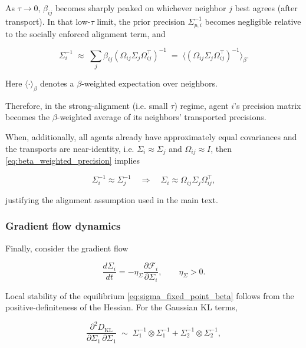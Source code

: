 \documentclass[11pt]{article}
\begin{document}
As $\tau \to 0$, $\beta_{ij}$ becomes sharply peaked on whichever neighbor $j$ best agrees (after transport). In that low-$\tau$ limit, the prior precision $\Sigma_{p,i}^{-1}$ becomes negligible relative to the socially enforced alignment term, and

\begin{equation}
\boxed{
\Sigma_i^{-1}
\;\approx\;
\sum_j \beta_{ij}
(\Omega_{ij}\Sigma_j\Omega_{ij}^\top)^{-1}
\;=\;\big\langle(\Omega_{ij}\Sigma_j\Omega_{ij}^\top)^{-1}
\big\rangle_{\beta}.}
\label{eq:beta_weighted_precision}
\end{equation}

Here $\langle \cdot \rangle_{\beta}$ denotes a $\beta$-weighted expectation over neighbors.  

Therefore, in the strong-alignment (i.e. small $\tau$) regime, agent $i$’s precision matrix becomes the $\beta$-weighted average of its neighbors' transported precisions.

When, additionally, all agents already have approximately equal covariances and the transports are near-identity, i.e. $\Sigma_i \approx \Sigma_j$ and $\Omega_{ij} \approx I$, then \eqref{eq:beta_weighted_precision} implies

\begin{equation}
\Sigma_i^{-1} \approx \Sigma_j^{-1}
\quad\Longrightarrow\quad
\Sigma_i \approx \Omega_{ij}\Sigma_j\Omega_{ij}^\top,
\end{equation}

justifying the alignment assumption used in the main text.

\subsubsection{Gradient flow dynamics}

Finally, consider the gradient flow

\begin{equation}
\frac{d\Sigma_i}{dt}
=-\eta_\Sigma
\frac{\partial \mathcal{F}_i}{\partial \Sigma_i},
\qquad\eta_\Sigma > 0.
\end{equation}

Local stability of the equilibrium \eqref{eq:sigma_fixed_point_beta} follows from the positive-definiteness of the Hessian. For the Gaussian KL terms,

\begin{equation}
\frac{\partial^2 D_{\mathrm{KL}}}{\partial \Sigma_1 \, \partial \Sigma_1}
\;\sim\;
\Sigma_1^{-1} \otimes \Sigma_1^{-1}
+ \Sigma_2^{-1} \otimes \Sigma_2^{-1},
\end{equation}
\end{document}
